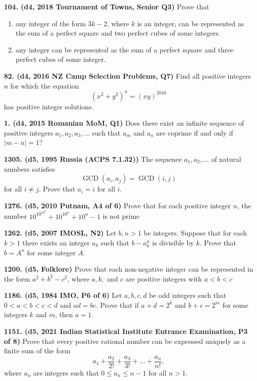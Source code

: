 \documentclass{article}
\begin{document}
\textbf{104. (\color{red}d4\color{black}, 2018 Tournament of Towns, Senior Q3)} Prove that\\
\begin{enumerate}
    \item any integer of the form \(3k-2\), where \(k\) is an integer, can be represented as the sum of a perfect square and two perfect cubes of some integers.
    \item any integer can be represented as the sum of a perfect square and three perfect cubes of some integer.
\end{enumerate}

\textbf{82. (\color{red}d4\color{black}, 2016 NZ Camp Selection Problems, Q7)} Find all positive integers \(n\) for which the equation \[(x^2+y^2)^n = (xy)^{2016}\] has positive integer solutions.

\textbf{1. (\color{red}d4\color{black}, 2015 Romanian MoM, Q1)} Does there exist an infinite sequence of positive integers $a_1, a_2, a_3, \dots$ such that $a_m$ and $a_n$ are coprime if and only if $\lvert m - n \rvert = 1$?

\textbf{1305. (\color{red}d5\color{black}, 1995 Russia (ACPS 7.1.32))} The sequence \(a_1, a_2, \ldots\) of natural numbers satisfies \[\operatorname{GCD}(a_i,a_j) = \operatorname{GCD}(i,j)\] for all \(i \neq j\).  Prove that \(a_i = i\) for all \(i\).

\textbf{1276. (\color{red}d5\color{black}, 2010 Putnam, A4 of 6)} Prove that for each positive integer $n$, the number $10^{10^{10^n}}+10^{10^n}+10^n-1$ is not prime

\textbf{1262. (\color{red}d5\color{black}, 2007 IMOSL, N2)} Let $b,n > 1$ be integers. Suppose that for each $k > 1$ there exists an integer $a_k$ such that $b - a^n_k$ is divisible by $k$. Prove that $b = A^n$ for some integer $A$.

\textbf{1200. (\color{red}d5\color{black}, Folklore)} Prove that each non-negative integer can be represented in the form $a^2+b^2-c^2$, where $a,b,$ and $c$ are positive integers with $a<b<c$

\textbf{1186. (\color{red}d5\color{black}, 1984 IMO, P6 of 6)} Let $a,b,c,d$ be odd integers such that $0<a<b<c<d$ and $ad=bc$. Prove that if $a+d=2^k$ and $b+c=2^m$ for some integers $k$ and $m$, then $a=1$.

\textbf{1151. (\color{red}d5\color{black}, 2021 Indian Statistical Institute Entrance Examination, P3 of 8)} Prove that every positive rational number can be expressed uniquely as a finite sum of the form$$a_1+\frac{a_2}{2!}+\frac{a_3}{3!}+\dots+\frac{a_n}{n!},$$where $a_n$ are integers such that $0 \leq a_n \leq n-1$ for all $n > 1$.
\end{document}
